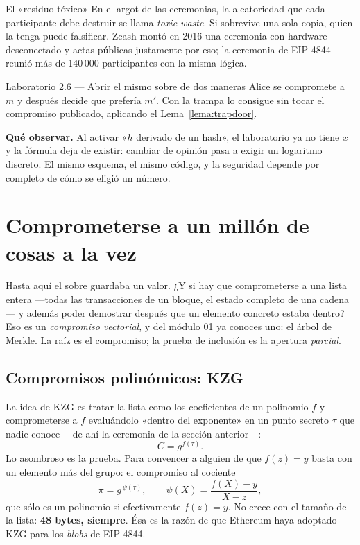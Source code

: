\documentclass[11pt,a4paper]{article}
\theoremstyle{definition}
\theoremstyle{plain}
\theoremstyle{remark}
\begin{document}
\begin{caso}{El «residuo tóxico»}
En el argot de las ceremonias, la aleatoriedad que cada participante debe
destruir se llama \emph{toxic waste}. Si sobrevive una sola copia, quien la tenga
puede falsificar. Zcash montó en 2016 una ceremonia con hardware desconectado y
actas públicas justamente por eso; la ceremonia de EIP-4844 reunió más de
140\,000 participantes con la misma lógica.
\end{caso}

\begin{laboratorio}{Laboratorio 2.6 — Abrir el mismo sobre de dos maneras}
Alice se compromete a $m$ y después decide que prefería $m'$. Con la trampa lo
consigue sin tocar el compromiso publicado, aplicando el
Lema~\ref{lema:trapdoor}.

\textbf{Qué observar.} Al activar «$h$ derivado de un hash», el laboratorio ya no
tiene $x$ y la fórmula deja de existir: cambiar de opinión pasa a exigir un
logaritmo discreto. El mismo esquema, el mismo código, y la seguridad depende
por completo de cómo se eligió un número.
\end{laboratorio}

\section{Comprometerse a un millón de cosas a la vez}

Hasta aquí el sobre guardaba un valor. ¿Y si hay que comprometerse a una lista
entera ---todas las transacciones de un bloque, el estado completo de una
cadena--- y además poder demostrar después que un elemento concreto estaba
dentro? Eso es un \emph{compromiso vectorial}, y del módulo 01 ya conoces uno: el
árbol de Merkle. La raíz es el compromiso; la prueba de inclusión es la apertura
\emph{parcial}.

\subsection{Compromisos polinómicos: KZG}

La idea de KZG es tratar la lista como los coeficientes de un polinomio $f$ y
comprometerse a $f$ evaluándolo «dentro del exponente» en un punto secreto $\tau$
que nadie conoce ---de ahí la ceremonia de la sección anterior---:
\[
  C = g^{f(\tau)}.
\]
Lo asombroso es la prueba. Para convencer a alguien de que $f(z) = y$ basta con
un elemento más del grupo: el compromiso al cociente
\[
  \pi = g^{\,\psi(\tau)}, \qquad
  \psi(X) = \frac{f(X) - y}{X - z},
\]
que sólo es un polinomio si efectivamente $f(z) = y$. No crece con el tamaño de
la lista: \textbf{48 bytes, siempre}. Ésa es la razón de que Ethereum haya
adoptado KZG para los \emph{blobs} de EIP-4844.
\end{document}
